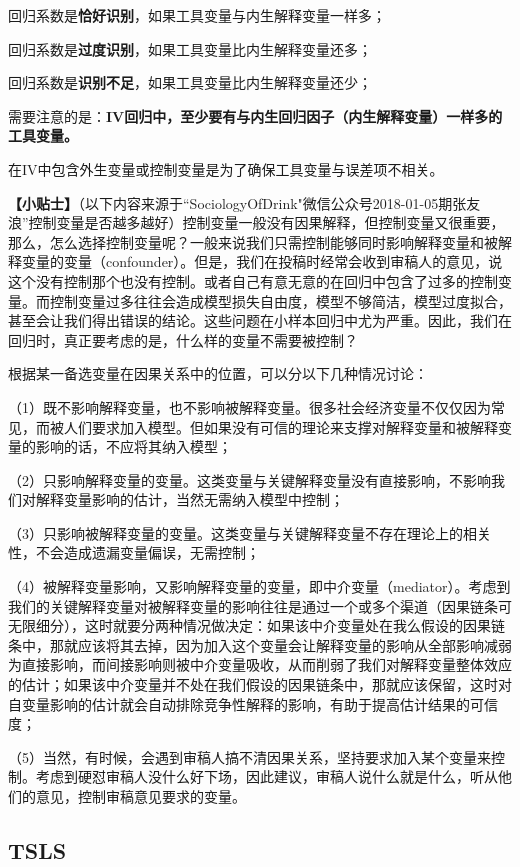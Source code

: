 \documentclass[cn,10pt,math=newtx,citestyle=gb7714-2015,bibstyle=gb7714-2015]{elegantbook}
\begin{document}
	回归系数是\textbf{恰好识别}，如果工具变量与内生解释变量一样多；
	
	回归系数是\textbf{过度识别}，如果工具变量比内生解释变量还多；
	
	回归系数是\textbf{识别不足}，如果工具变量比内生解释变量还少；
	
	需要注意的是：\textbf{IV回归中，至少要有与内生回归因子（内生解释变量）一样多的工具变量。}
	
	在IV中包含外生变量或控制变量是为了确保工具变量与误差项不相关。
	
	\textbf{【小贴士】}（以下内容来源于“SociologyOfDrink"微信公众号2018-01-05期张友浪”控制变量是否越多越好）控制变量一般没有因果解释，但控制变量又很重要，那么，怎么选择控制变量呢？一般来说我们只需控制能够同时影响解释变量和被解释变量的变量（confounder）。但是，我们在投稿时经常会收到审稿人的意见，说这个没有控制那个也没有控制。或者自己有意无意的在回归中包含了过多的控制变量。而控制变量过多往往会造成模型损失自由度，模型不够简洁，模型过度拟合，甚至会让我们得出错误的结论。这些问题在小样本回归中尤为严重。因此，我们在回归时，真正要考虑的是，什么样的变量不需要被控制？
	
	根据某一备选变量在因果关系中的位置，可以分以下几种情况讨论：
	
	（1）既不影响解释变量，也不影响被解释变量。很多社会经济变量不仅仅因为常见，而被人们要求加入模型。但如果没有可信的理论来支撑对解释变量和被解释变量的影响的话，不应将其纳入模型；
	
	（2）只影响解释变量的变量。这类变量与关键解释变量没有直接影响，不影响我们对解释变量影响的估计，当然无需纳入模型中控制；
	
	（3）只影响被解释变量的变量。这类变量与关键解释变量不存在理论上的相关性，不会造成遗漏变量偏误，无需控制；
	
	（4）被解释变量影响，又影响解释变量的变量，即中介变量（mediator）。考虑到我们的关键解释变量对被解释变量的影响往往是通过一个或多个渠道（因果链条可无限细分），这时就要分两种情况做决定：如果该中介变量处在我么假设的因果链条中，那就应该将其去掉，因为加入这个变量会让解释变量的影响从全部影响减弱为直接影响，而间接影响则被中介变量吸收，从而削弱了我们对解释变量整体效应的估计；如果该中介变量并不处在我们假设的因果链条中，那就应该保留，这时对自变量影响的估计就会自动排除竞争性解释的影响，有助于提高估计结果的可信度；
	
	（5）当然，有时候，会遇到审稿人搞不清因果关系，坚持要求加入某个变量来控制。考虑到硬怼审稿人没什么好下场，因此建议，审稿人说什么就是什么，听从他们的意见，控制审稿意见要求的变量。
	
	\subsection{TSLS}
	
\end{document}
